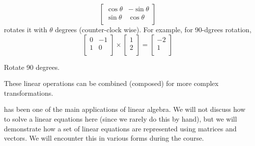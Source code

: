 \begin{itemize}
\[\begin{bmatrix}
          \cos\theta & -\sin\theta \\
          \sin\theta & \cos\theta \\
        \end{bmatrix}
    \]
  rotates it with $\theta$ degrees (counter-clock wise).
  For example, for 90-dgrees rotation,
    \[
      \begin{bmatrix}
        0 & -1 \\
        1 & 0 \\
      \end{bmatrix}
      \times
      \begin{bmatrix}
        1 \\
        2 \\
      \end{bmatrix}
      =
      \begin{bmatrix}
        -2 \\
        1 \\
      \end{bmatrix}
    \]
  \begin{marginfigure}
    \caption{Rotate 90 degrees.}
  \end{marginfigure}
\end{itemize}

These linear operations can be combined (composed)
for more complex transformations.

 has been one of
the main applications of linear algebra.
We will not discuss how to solve a linear equations here
(since we rarely do this by hand),
but we will demonstrate how a set of linear equations are represented using matrices
and vectors.
We will encounter this in various forms during the course.


